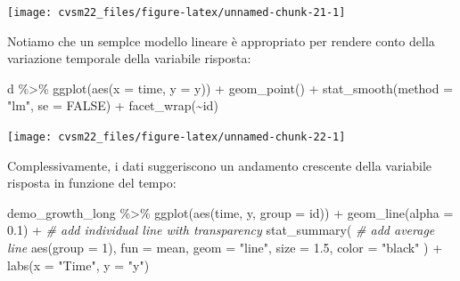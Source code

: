 \documentclass[
  11pt,
]{krantz}
\makeatletter
\newenvironment{Shaded}{\begin{snugshade}}{\end{snugshade}}
\newcommand{\AttributeTok}[1]{\textcolor[rgb]{0.61,0.61,0.61}{#1}}
\newcommand{\CommentTok}[1]{\textcolor[rgb]{0.37,0.37,0.37}{\textit{#1}}}
\newcommand{\ConstantTok}[1]{\textcolor[rgb]{0,0,0}{#1}}
\newcommand{\DecValTok}[1]{\textcolor[rgb]{0.06,0.06,0.06}{#1}}
\newcommand{\FloatTok}[1]{\textcolor[rgb]{0.06,0.06,0.06}{#1}}
\newcommand{\FunctionTok}[1]{\textcolor[rgb]{0,0,0}{#1}}
\newcommand{\NormalTok}[1]{#1}
\newcommand{\SpecialCharTok}[1]{\textcolor[rgb]{0,0,0}{#1}}
\newcommand{\StringTok}[1]{\textcolor[rgb]{0.5,0.5,0.5}{#1}}
\newenvironment{kframe}{%
\medskip{}
\setlength{\fboxsep}{.8em}
 \def\at@end@of@kframe{}%
 \ifinner\ifhmode%
  \def\at@end@of@kframe{\end{minipage}}%
  \begin{minipage}{\columnwidth}%
 \fi\fi%
 \def\FrameCommand##1{\hskip\@totalleftmargin \hskip-\fboxsep
 \colorbox{shadecolor}{##1}\hskip-\fboxsep
     \hskip-\linewidth \hskip-\@totalleftmargin \hskip\columnwidth}%
 \MakeFramed {\advance\hsize-\width
   \@totalleftmargin\z@ \linewidth\hsize
   \@setminipage}}%
 {\par\unskip\endMakeFramed%
 \at@end@of@kframe}
\renewenvironment{Shaded}{\begin{kframe}}{\end{kframe}}
\theoremstyle{definition}
\theoremstyle{definition}
\theoremstyle{definition}
\theoremstyle{definition}
\theoremstyle{remark}
\makeatother
\begin{document}
\begin{center}\texttt{[image: cvsm22\_files/figure-latex/unnamed-chunk-21-1]} \end{center}

Notiamo che un semplce modello lineare è appropriato per rendere conto della variazione temporale della variabile risposta:

\begin{Shaded}
\begin{Highlighting}[]
\NormalTok{d }\SpecialCharTok{\%\textgreater{}\%}
  \FunctionTok{ggplot}\NormalTok{(}\FunctionTok{aes}\NormalTok{(}\AttributeTok{x =}\NormalTok{ time, }\AttributeTok{y =}\NormalTok{ y)) }\SpecialCharTok{+}
  \FunctionTok{geom\_point}\NormalTok{() }\SpecialCharTok{+}
  \FunctionTok{stat\_smooth}\NormalTok{(}\AttributeTok{method =} \StringTok{"lm"}\NormalTok{, }\AttributeTok{se =} \ConstantTok{FALSE}\NormalTok{) }\SpecialCharTok{+}
  \FunctionTok{facet\_wrap}\NormalTok{(}\SpecialCharTok{\textasciitilde{}}\NormalTok{id)}
\end{Highlighting}
\end{Shaded}

\begin{center}\texttt{[image: cvsm22\_files/figure-latex/unnamed-chunk-22-1]} \end{center}

Complessivamente, i dati suggeriscono un andamento crescente della variabile risposta in funzione del tempo:

\begin{Shaded}
\begin{Highlighting}[]
\NormalTok{demo\_growth\_long }\SpecialCharTok{\%\textgreater{}\%}
  \FunctionTok{ggplot}\NormalTok{(}\FunctionTok{aes}\NormalTok{(time, y, }\AttributeTok{group =}\NormalTok{ id)) }\SpecialCharTok{+}
  \FunctionTok{geom\_line}\NormalTok{(}\AttributeTok{alpha =} \FloatTok{0.1}\NormalTok{) }\SpecialCharTok{+} \CommentTok{\# add individual line with transparency}
  \FunctionTok{stat\_summary}\NormalTok{( }\CommentTok{\# add average line}
    \FunctionTok{aes}\NormalTok{(}\AttributeTok{group =} \DecValTok{1}\NormalTok{),}
    \AttributeTok{fun =}\NormalTok{ mean,}
    \AttributeTok{geom =} \StringTok{"line"}\NormalTok{,}
    \AttributeTok{size =} \FloatTok{1.5}\NormalTok{,}
    \AttributeTok{color =} \StringTok{"black"}
\NormalTok{  ) }\SpecialCharTok{+}
  \FunctionTok{labs}\NormalTok{(}\AttributeTok{x =} \StringTok{"Time"}\NormalTok{, }\AttributeTok{y =} \StringTok{"y"}\NormalTok{)}
\end{Highlighting}
\end{Shaded}
\end{document}
